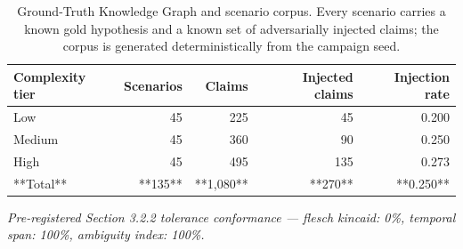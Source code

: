\begin{table}[htbp]
\centering
\small
\caption{Ground-Truth Knowledge Graph and scenario corpus. Every scenario carries a known gold hypothesis and a known set of adversarially injected claims; the corpus is generated deterministically from the campaign seed.}
\label{tab:gmais-1}
\begin{tabular}{lrrrr}
\toprule
Complexity tier & Scenarios & Claims & Injected claims & Injection rate \\
\midrule
Low & 45 & 225 & 45 & 0.200 \\
Medium & 45 & 360 & 90 & 0.250 \\
High & 45 & 495 & 135 & 0.273 \\
**Total** & **135** & **1,080** & **270** & **0.250** \\
\bottomrule
\end{tabular}
\par\vspace{2pt}\footnotesize\emph{Pre-registered Section 3.2.2 tolerance conformance --- flesch kincaid: 0\%, temporal span: 100\%, ambiguity index: 100\%.}
\end{table}

